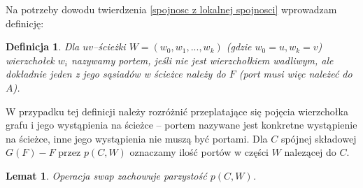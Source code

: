 \documentclass{pracamgr}
\newtheorem{defi}[theorem]{Definicja}
\newtheorem{lemma}[theorem]{Lemat}
\begin{document}
    Na potrzeby dowodu twierdzenia \ref{spojnosc z lokalnej spojnosci} wprowadzam definicję:
    \begin{defi}\label{port}
     Dla $uv$--ścieżki $W=(w_0,w_1,...,w_k)$ (gdzie $w_0=u,w_k=v$) wierzchołek
     $w_i$ nazywamy portem, jeśli nie jest wierzchołkiem wadliwym, ale dokładnie jeden z jego sąsiadów w ścieżce należy do $F$ (port musi więc należeć do $A$).
    \end{defi}
    W przypadku tej definicji należy rozróżnić przeplatające się pojęcia wierzchołka grafu i jego wystąpienia na ścieżce --
    portem nazywane jest konkretne wystąpienie na ścieżce, inne jego wystąpienia nie muszą być portami.\newline
    Dla $C$ spójnej składowej $G(F)-F$ przez $p(C,W)$ oznaczamy ilość portów w części $W$ nalezącej do $C$.
    \begin{lemma}\label{parzystosc portow swap}
     Operacja swap zachowuje parzystość $p(C,W)$.
    \end{lemma}
\end{document}
